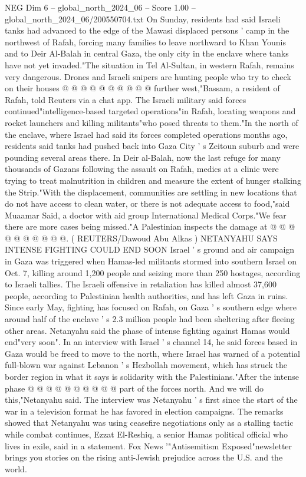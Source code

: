 \begin{textsample}{NEG Dim 6 – global\_north\_2024\_06 – Score 1.00 – global\_north\_2024\_06/200550704.txt}
On Sunday, residents had said Israeli tanks had advanced to the edge of the Mawasi displaced persons ' camp in the northwest of Rafah, forcing many families to leave northward to Khan Younis and to Deir Al-Balah in central Gaza, the only city in the enclave where tanks have not yet invaded."The situation in Tel Al-Sultan, in western Rafah, remains very dangerous.
Drones and Israeli snipers are hunting people who try to check on their houses @ @ @ @ @ @ @ @ @ @ further west,"Bassam, a resident of Rafah, told Reuters via a chat app.
The Israeli military said forces continued"intelligence-based targeted operations"in Rafah, locating weapons and rocket launchers and killing militants"who posed threats to them."In the north of the enclave, where Israel had said its forces completed operations months ago, residents said tanks had pushed back into Gaza City ' s Zeitoun suburb and were pounding several areas there.
In Deir al-Balah, now the last refuge for many thousands of Gazans following the assault on Rafah, medics at a clinic were trying to treat malnutrition in children and measure the extent of hunger stalking the Strip."With the displacement, communities are settling in new locations that do not have access to clean water, or there is not adequate access to food,"said Muaamar Said, a doctor with aid group International Medical Corps."We fear there are more cases being missed."A Palestinian inspects the damage at @ @ @ @ @ @ @ @ @ @. ( REUTERS/Dawoud Abu Alkas ) NETANYAHU SAYS INTENSE FIGHTING COULD END SOON Israel ' s ground and air campaign in Gaza was triggered when Hamas-led militants stormed into southern Israel on Oct. 7, killing around 1,200 people and seizing more than 250 hostages, according to Israeli tallies.
The Israeli offensive in retaliation has killed almost 37,600 people, according to Palestinian health authorities, and has left Gaza in ruins.
Since early May, fighting has focused on Rafah, on Gaza ' s southern edge where around half of the enclave ' s 2.3 million people had been sheltering after fleeing other areas.
Netanyahu said the phase of intense fighting against Hamas would end"very soon".
In an interview with Israel ' s channel 14, he said forces based in Gaza would be freed to move to the north, where Israel has warned of a potential full-blown war against Lebanon ' s Hezbollah movement, which has struck the border region in what it says is solidarity with the Palestinians."After the intense phase @ @ @ @ @ @ @ @ @ @ part of the forces north.
And we will do this,"Netanyahu said.
The interview was Netanyahu ' s first since the start of the war in a television format he has favored in election campaigns.
The remarks showed that Netanyahu was using ceasefire negotiations only as a stalling tactic while combat continues, Ezzat El-Reshiq, a senior Hamas political official who lives in exile, said in a statement.
Fox News '"Antisemitism Exposed"newsletter brings you stories on the rising anti-Jewish prejudice across the U.S. and the world.

\end{textsample}
